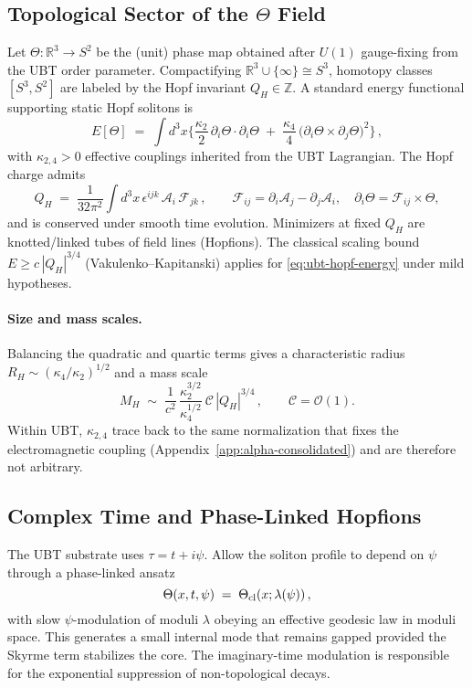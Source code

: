 \documentclass[12pt,a4paper]{article}
\begin{document}
\subsection{Topological Sector of the $\Theta$ Field}
Let $\Theta:\mathbb{R}^3\!\to\!S^2$ be the (unit) phase map obtained after $U(1)$ gauge-fixing from the UBT order parameter.
Compactifying $\mathbb{R}^3\cup\{\infty\}\cong S^3$, homotopy classes $[S^3,S^2]$ are labeled by the Hopf invariant $Q_H\in\mathbb{Z}$.
A standard energy functional supporting static Hopf solitons is
\begin{equation}
\label{eq:ubt-hopf-energy}
E[\Theta] \;=\; \int d^3x \Big\{ \frac{\kappa_2}{2}\,\partial_i\Theta\!\cdot\!\partial_i\Theta \;+\; \frac{\kappa_4}{4}\,\big(\partial_i\Theta\times\partial_j\Theta\big)^2 \Big\}\,,
\end{equation}
with $\kappa_{2,4}>0$ effective couplings inherited from the UBT Lagrangian. The Hopf charge admits
\begin{equation}
Q_H \;=\; \frac{1}{32\pi^2}\int d^3x\,\epsilon^{ijk}\,\mathcal{A}_i\,\mathcal{F}_{jk}\,,\qquad
\mathcal{F}_{ij}=\partial_i\mathcal{A}_j-\partial_j\mathcal{A}_i,\quad
\partial_i\Theta=\mathcal{F}_{ij}\times \Theta,
\end{equation}
and is conserved under smooth time evolution. Minimizers at fixed $Q_H$ are knotted/linked tubes of field lines (Hopfions).
The classical scaling bound $E \ge c\,|Q_H|^{3/4}$ (Vakulenko--Kapitanski) applies for \eqref{eq:ubt-hopf-energy} under mild hypotheses.

\paragraph{Size and mass scales.}
Balancing the quadratic and quartic terms gives a characteristic radius $R_H\sim(\kappa_4/\kappa_2)^{1/2}$ and a mass scale
\begin{equation}
M_H \;\sim\; \frac{1}{c^2}\,\frac{\kappa_2^{3/2}}{\kappa_4^{1/2}}\ \mathcal{C}\,|Q_H|^{3/4}\,,\qquad \mathcal{C}=\mathcal{O}(1).
\end{equation}
Within UBT, $\kappa_{2,4}$ trace back to the same normalization that fixes the electromagnetic coupling (Appendix~\ref{app:alpha-consolidated})
and are therefore not arbitrary.

\subsection{Complex Time and Phase-Linked Hopfions}
The UBT substrate uses $\tau=t+i\psi$. Allow the soliton profile to depend on $\psi$ through a phase-linked ansatz
\begin{equation}
\Theta(x,t,\psi) \;=\; \Theta_{\rm cl}(x;\lambda(\psi))\,,
\end{equation}
with slow $\psi$-modulation of moduli $\lambda$ obeying an effective geodesic law in moduli space.
This generates a small internal mode that remains gapped provided the Skyrme term stabilizes the core.
The imaginary-time modulation is responsible for the exponential suppression of non-topological decays.
\end{document}
